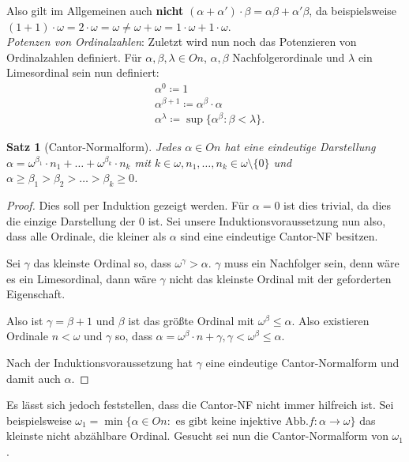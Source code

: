 \documentclass[german]{article}
\theoremstyle{break}
\theoremstyle{def_style}
\theoremstyle{def_style}
\newtheorem{satz}{Satz}[section]
\theoremstyle{lemma_style}
\begin{document}
Also gilt im Allgemeinen auch \textbf{nicht} $(\alpha+\alpha')\cdot\beta=\alpha\beta+\alpha'\beta$, da beispielsweise $(1+1)\cdot\omega=2\cdot\omega=\omega \neq \omega+\omega = 1\cdot\omega+1\cdot\omega$.\\

\textit{Potenzen von Ordinalzahlen}: Zuletzt wird nun noch das Potenzieren von Ordinalzahlen definiert. Für $\alpha,\beta,\lambda\in On$, $\alpha, \beta$ Nachfolgerordinale und $\lambda$ ein Limesordinal sein nun definiert:
\begin{align*}
	&\alpha^0\coloneqq1\\
	&\alpha^{\beta+1}\coloneqq\alpha^\beta\cdot\alpha\\
	&\alpha^\lambda\coloneqq\sup\{\alpha^\beta:\beta<\lambda\}.
\end{align*}

\begin{satz}[Cantor-Normalform]
	Jedes $\alpha\in On$ hat eine eindeutige Darstellung $\alpha=\omega^{\beta_1}\cdot n_1+\dots+\omega^{\beta_k}\cdot n_k$ mit $k\in\omega, n_1,\dots, n_k\in\omega\setminus\{0\}$ und $\alpha\geq\beta_1>\beta_2>\dots>\beta_k\geq0$.
\end{satz}
\begin{proof}
	Dies soll per Induktion gezeigt werden. Für $\alpha=0$ ist dies trivial, da dies die einzige Darstellung der $0$ ist. Sei unsere Induktionsvoraussetzung nun also, dass alle Ordinale, die kleiner als $\alpha$ sind eine eindeutige Cantor-NF besitzen.
	
	Sei $\gamma$ das kleinste Ordinal so, dass $\omega^\gamma>\alpha$. $\gamma$ muss ein Nachfolger sein, denn wäre es ein Limesordinal, dann wäre $\gamma$ nicht das kleinste Ordinal mit der geforderten Eigenschaft.
	
	Also ist $\gamma=\beta+1$ und $\beta$ ist das größte Ordinal mit $\omega^\beta \leq \alpha$. Also existieren Ordinale $n<\omega$ und $\gamma$ so, dass $\alpha=\omega^\beta\cdot n+\gamma, \gamma<\omega^\beta\leq\alpha$.
	
	Nach der Induktionsvoraussetzung hat $\gamma$ eine eindeutige Cantor-Normalform und damit auch $\alpha$.
\end{proof}

Es lässt sich jedoch feststellen, dass die Cantor-NF nicht immer hilfreich ist. Sei beispielsweise $\omega_1=\min\{\alpha\in On : \text{ es gibt keine injektive Abb.} f:\alpha\to\omega\}$ das kleinste nicht abzählbare Ordinal. Gesucht sei nun die Cantor-Normalform von $\omega_1$.
\end{document}
